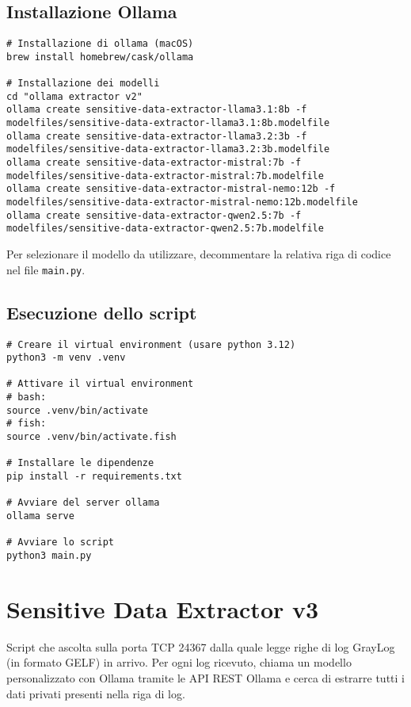 \documentclass[12pt]{report}
\begin{document}
\subsection*{Installazione Ollama}
\label{subsec:installazione_ollama_v2}

\begin{verbatim}
# Installazione di ollama (macOS)
brew install homebrew/cask/ollama

# Installazione dei modelli
cd "ollama extractor v2"
ollama create sensitive-data-extractor-llama3.1:8b -f modelfiles/sensitive-data-extractor-llama3.1:8b.modelfile
ollama create sensitive-data-extractor-llama3.2:3b -f modelfiles/sensitive-data-extractor-llama3.2:3b.modelfile
ollama create sensitive-data-extractor-mistral:7b -f modelfiles/sensitive-data-extractor-mistral:7b.modelfile
ollama create sensitive-data-extractor-mistral-nemo:12b -f modelfiles/sensitive-data-extractor-mistral-nemo:12b.modelfile
ollama create sensitive-data-extractor-qwen2.5:7b -f modelfiles/sensitive-data-extractor-qwen2.5:7b.modelfile
\end{verbatim}

Per selezionare il modello da utilizzare, decommentare la relativa riga di codice nel file \texttt{main.py}.

\subsection*{Esecuzione dello script}
\label{subsec:esecuzione_script_v2}

\begin{verbatim}
# Creare il virtual environment (usare python 3.12)
python3 -m venv .venv

# Attivare il virtual environment
# bash:
source .venv/bin/activate
# fish:
source .venv/bin/activate.fish

# Installare le dipendenze
pip install -r requirements.txt

# Avviare del server ollama
ollama serve

# Avviare lo script
python3 main.py
\end{verbatim}


\section{Sensitive Data Extractor v3}
\label{sec:sde_v3}

Script che ascolta sulla porta TCP 24367 dalla quale legge righe di log GrayLog (in formato GELF) in arrivo.
Per ogni log ricevuto, chiama un modello personalizzato con Ollama tramite le API REST Ollama e cerca di estrarre tutti i dati privati presenti nella riga di log.
\end{document}

